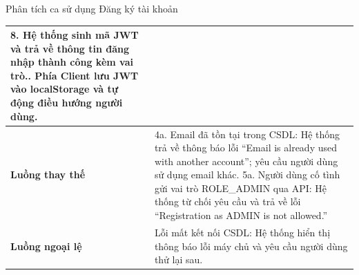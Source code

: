 \documentclass{uetgraduation}
\begin{document}
\begin{table}[!htbp]{Phân tích ca sử dụng Đăng ký tài khoản}
\begin{tabularx}{\textwidth}{|l|>{\raggedright\arraybackslash}X|}
8. Hệ thống sinh mã JWT và trả về thông tin đăng nhập thành công kèm vai trò.\newline
9. Phía Client lưu JWT vào localStorage và tự động điều hướng người dùng. \\ \hline
\textbf{Luồng thay thế} & 
4a. Email đã tồn tại trong CSDL: Hệ thống trả về thông báo lỗi ``Email is already used with another account''; yêu cầu người dùng sử dụng email khác.\newline
5a. Người dùng cố tình gửi vai trò ROLE\_ADMIN qua API: Hệ thống từ chối yêu cầu và trả về lỗi ``Registration as ADMIN is not allowed.'' \\ \hline
\textbf{Luồng ngoại lệ} & 
Lỗi mất kết nối CSDL: Hệ thống hiển thị thông báo lỗi máy chủ và yêu cầu người dùng thử lại sau. \\ \hline
\end{tabularx}
\end{table}

\clearpage
\end{document}
